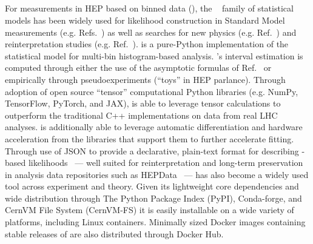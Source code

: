 \subsection{\pyhf{}}\label{subsec:pyhf}

For measurements in HEP based on binned data (), the \HiFa{}~\cite{Cranmer:1456844} family of statistical models has been widely used for likelihood construction in Standard Model measurements (e.g. Refs.~\cite{HIGG-2013-02,Aaij:2015sqa}) as well as searches for new physics (e.g. Ref.~\cite{SUSY-2016-10}) and reinterpretation studies (e.g. Ref.~\cite{Alguero:2020grj}).
\pyhf{} is a pure-Python implementation of the \HiFa{} statistical model for multi-bin histogram-based analysis.
\pyhf{}'s interval estimation is computed through either the use of the asymptotic formulas of Ref.~\cite{Cowan:2010js} or empirically through pseudoexperiments (``toys'' in HEP parlance).
Through adoption of open source ``tensor'' computational Python libraries (e.g. NumPy, TensorFlow, PyTorch, and JAX), \pyhf{} is able to leverage tensor calculations to outperform the traditional C++ implementations on data from real LHC analyses.
\pyhf{} is additionally able to leverage automatic differentiation and hardware acceleration from the libraries that support them to further accelerate fitting.
Through use of JSON to provide a declarative, plain-text format for describing \HiFa{}-based likelihoods~\cite{ATL-PHYS-PUB-2019-029} --- well suited for reinterpretation and long-term preservation in analysis data repositories such as HEPData~\cite{Maguire:2017ypu} --- \pyhf{} has also become a widely used tool across experiment and theory.
Given its lightweight core dependencies and wide distribution through The Python Package Index (PyPI), Conda-forge, and CernVM File System (CernVM-FS) it is easily installable on a wide variety of platforms, including Linux containers.
Minimally sized Docker images containing stable releases of \pyhf{} are also distributed through Docker Hub.

